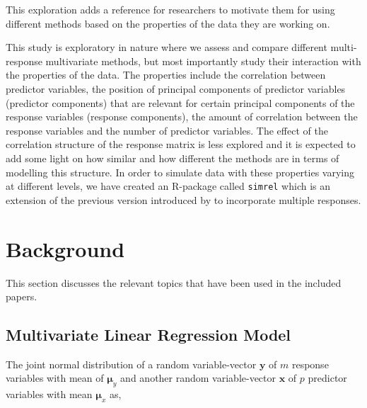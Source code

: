 \documentclass[11pt,twoside,openright,titlepage,
  headinclude,footinclude,BCOR=5mm,
  numbers=noenddot,cleardoublepage=empty,
  tablecaptionabove, dottedtoc,
  bibliography=totoc,paper=a4]{scrreprt}
\begin{document}
This exploration adds a reference for researchers to motivate them for using different methods based on the properties of the data they are working on.

This study is exploratory in nature where we assess and compare different multi-response multivariate methods, but most importantly study their interaction with the properties of the data. The properties include the correlation between predictor variables, the position of principal components of predictor variables (predictor components) that are relevant for certain principal components of the response variables (response components), the amount of correlation between the response variables and the number of predictor variables. The effect of the correlation structure of the response matrix is less explored and it is expected to add some light on how similar and how different the methods are in terms of modelling this structure. In order to simulate data with these properties varying at different levels, we have created an R-package called \texttt{simrel} which is an extension of the previous version introduced by \citet{saebo2015simrel} to incorporate multiple responses.

\hypertarget{background}{%
\chapter{Background}\label{background}}

This section discusses the relevant topics that have been used in the included papers.

\hypertarget{multivariate-linear-regression-model}{%
\section{Multivariate Linear Regression Model}\label{multivariate-linear-regression-model}}

The joint normal distribution of a random variable-vector \(\mathbf{y}\) of \(m\) response variables with mean of \(\boldsymbol{\mu}_y\) and another random variable-vector \(\mathbf{x}\) of \(p\) predictor variables with mean \(\boldsymbol{\mu}_x\) as,
\end{document}
